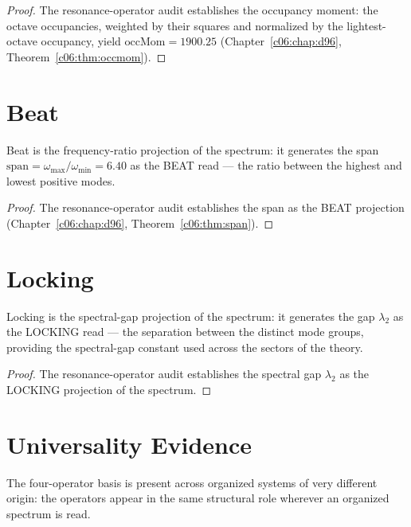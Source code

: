 \begin{proof}
The resonance-operator audit \cite{c07:QG261} establishes the occupancy moment: the octave
occupancies, weighted by their squares and normalized by the lightest-octave occupancy,
yield $\mathrm{occMom} = 1900.25$ (Chapter~\ref{c06:chap:d96},
Theorem~\ref{c06:thm:occmom}).
\end{proof}

\section{Beat}
\label{c07:sec:beat}

\begin{theorem}
\label{c07:thm:beat-span}
Beat is the frequency-ratio projection of the spectrum: it generates the span
$\mathrm{span} = \omega_{\max}/\omega_{\min} = 6.40$ as the BEAT read --- the ratio between
the highest and lowest positive modes.
\end{theorem}

\begin{proof}
The resonance-operator audit \cite{c07:QG261} establishes the span as the BEAT projection
(Chapter~\ref{c06:chap:d96}, Theorem~\ref{c06:thm:span}).
\end{proof}

\section{Locking}
\label{c07:sec:locking}

\begin{theorem}
\label{c07:thm:locking-gap}
Locking is the spectral-gap projection of the spectrum: it generates the gap $\lambda_2$ as
the LOCKING read --- the separation between the distinct mode groups, providing the
spectral-gap constant used across the sectors of the theory.
\end{theorem}

\begin{proof}
The resonance-operator audit \cite{c07:QG261} establishes the spectral gap $\lambda_2$ as
the LOCKING projection of the spectrum.
\end{proof}

\section{Universality Evidence}
\label{c07:sec:universality}

\begin{theorem}
\label{c07:thm:operators-universal}
The four-operator basis is present across organized systems of very different origin: the
operators appear in the same structural role wherever an organized spectrum is read.
\end{theorem}

